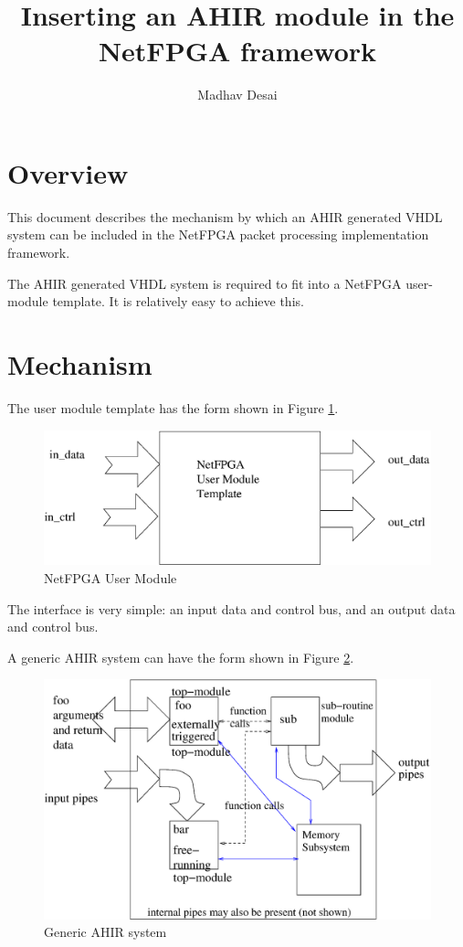 \documentclass{article}
\title{Inserting an AHIR module in the NetFPGA framework}
\author{Madhav Desai}
\begin{document}
\maketitle

\section{Overview}

This document describes the mechanism by which an 
AHIR generated VHDL system can be included in the NetFPGA packet
processing implementation framework.  

The AHIR generated VHDL system is required to fit into 
a NetFPGA user-module template. It is relatively easy to
achieve this. 


\section{Mechanism}

The user module template has the form shown in Figure \ref{fig:NetFPGAUserModule}.
\begin{figure}
  \centering
  \includegraphics[scale=0.7]{NetFPGAUserModule.eps}
  \caption{NetFPGA User Module}
  \label{fig:NetFPGAUserModule}
\end{figure}
The interface is very simple: an input data and control bus,
and an output data and control bus.

A generic AHIR system can have the form shown in Figure \ref{fig:GenericAhirSystem}.
\begin{figure}
  \centering
  \includegraphics[scale=0.7]{GenericAhirSystem.eps}
  \caption{Generic AHIR system}
  \label{fig:GenericAhirSystem}
\end{figure}
\end{document}
